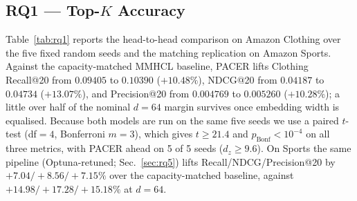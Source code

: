 \documentclass[conference]{IEEEtran}
\begin{document}
\subsection{RQ1 --- Top-$K$ Accuracy}
\label{sec:rq1}

Table~\ref{tab:rq1} reports the head-to-head comparison on Amazon
Clothing over the five fixed random seeds and the matching
replication on Amazon Sports. Against the capacity-matched MMHCL
baseline, PACER lifts Clothing Recall@20 from $0.09405$ to $0.10390$
($+10.48\%$), NDCG@20 from $0.04187$ to $0.04734$ ($+13.07\%$), and
Precision@20 from $0.004769$ to $0.005260$ ($+10.28\%$); a little
over half of the nominal $d{=}64$ margin survives once embedding
width is equalised. Because both models are run on the same five
seeds we use a paired $t$-test (df$=4$, Bonferroni $m{=}3$), which
gives $t{\ge}21.4$ and $p_{\mathrm{Bonf}}{<}10^{-4}$ on all three
metrics, with PACER ahead on 5 of 5 seeds ($d_{z}{\ge}9.6$). On Sports
the same pipeline (Optuna-retuned;
Sec.~\ref{sec:rq5}) lifts Recall/NDCG/Precision@20 by
$+7.04/+8.56/+7.15\%$ over the capacity-matched baseline, against
$+14.98/+17.28/+15.18\%$ at $d{=}64$.
\end{document}
